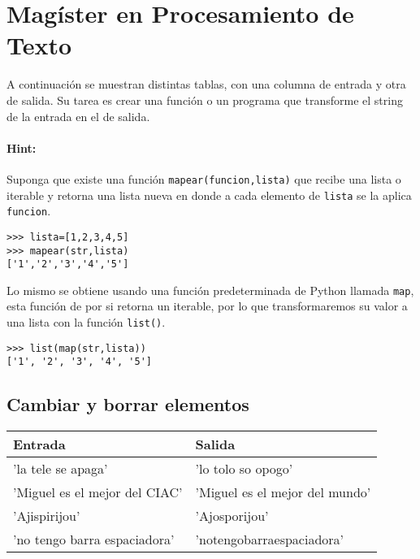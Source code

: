 \section{Magíster en Procesamiento de Texto}
A continuación se muestran distintas tablas, con una columna de entrada y otra de salida. Su tarea es crear una función o un programa que transforme el string de la entrada en el de salida.

\paragraph{Hint:} Suponga que existe una función \texttt{mapear(funcion,lista)} que recibe una lista o iterable y retorna una lista nueva en donde a cada elemento de \texttt{lista} se la aplica \texttt{funcion}.



\begin{lstlisting}[style=consola]
>>> lista=[1,2,3,4,5]
>>> mapear(str,lista)
['1','2','3','4','5']
\end{lstlisting}

Lo mismo se obtiene usando una función predeterminada de Python llamada \texttt{map}, esta función de por si retorna un iterable, por lo que transformaremos su valor a una lista con la función \texttt{list()}.

\begin{lstlisting}[style=consola]
>>> list(map(str,lista))
['1', '2', '3', '4', '5']
\end{lstlisting}


\subsection{Cambiar y borrar elementos}
\begin{table}[h]
	\centering
	\label{replace}
	\begin{tabular}{|l|l|}
		\hline
		\textbf{Entrada}              & \textbf{Salida}                \\ \hline
		'la tele se apaga'            & 'lo tolo so opogo'             \\ \hline
		'Miguel es el mejor del CIAC' & 'Miguel es el mejor del mundo' \\ \hline
		'Ajispirijou'                 & 'Ajosporijou'                  \\ \hline
		'no tengo barra espaciadora'  & 'notengobarraespaciadora'      \\ \hline
	\end{tabular}
\end{table}

